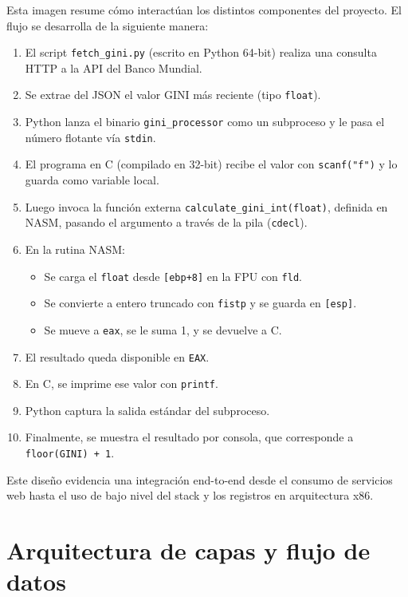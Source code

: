 \documentclass[a4paper,12pt]{article}
\begin{document}
Esta imagen resume cómo interactúan los distintos componentes del proyecto. El flujo se desarrolla de la siguiente manera:

\begin{enumerate}[label=\textbf{\arabic*.}]
  \item El script \texttt{fetch\_gini.py} (escrito en Python 64-bit) realiza una consulta HTTP a la API del Banco Mundial.
  \item Se extrae del JSON el valor GINI más reciente (tipo \texttt{float}).
  \item Python lanza el binario \texttt{gini\_processor} como un subproceso y le pasa el número flotante vía \texttt{stdin}.
  \item El programa en C (compilado en 32-bit) recibe el valor con \texttt{scanf("f")} y lo guarda como variable local.
  \item Luego invoca la función externa \texttt{calculate\_gini\_int(float)}, definida en NASM, pasando el argumento a través de la pila (\texttt{cdecl}).
  \item En la rutina NASM:
    \begin{itemize}
      \item Se carga el \texttt{float} desde \texttt{[ebp+8]} en la FPU con \texttt{fld}.
      \item Se convierte a entero truncado con \texttt{fistp} y se guarda en \texttt{[esp]}.
      \item Se mueve a \texttt{eax}, se le suma 1, y se devuelve a C.
    \end{itemize}
  \item El resultado queda disponible en \texttt{EAX}.
  \item En C, se imprime ese valor con \texttt{printf}.
  \item Python captura la salida estándar del subproceso.
  \item Finalmente, se muestra el resultado por consola, que corresponde a \texttt{floor(GINI) + 1}.
\end{enumerate}

Este diseño evidencia una integración end-to-end desde el consumo de servicios web hasta el uso de bajo nivel del stack y los registros en arquitectura x86.

\section{Arquitectura de capas y flujo de datos}
\end{document}
